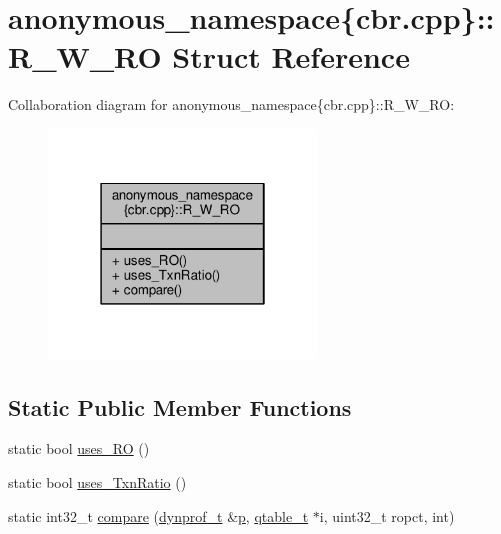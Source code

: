 \hypertarget{structanonymous__namespace_02cbr_8cpp_03_1_1R__W__RO}{\section{anonymous\-\_\-namespace\{cbr.\-cpp\}\-:\-:R\-\_\-\-W\-\_\-\-R\-O Struct Reference}
\label{structanonymous__namespace_02cbr_8cpp_03_1_1R__W__RO}
}


Collaboration diagram for anonymous\-\_\-namespace\{cbr.\-cpp\}\-:\-:R\-\_\-\-W\-\_\-\-R\-O\-:
\nopagebreak
\begin{figure}[H]
\begin{center}
\leavevmode
\includegraphics[width=202pt]{structanonymous__namespace_02cbr_8cpp_03_1_1R__W__RO__coll__graph}
\end{center}
\end{figure}
\subsection*{Static Public Member Functions}
\begin{DoxyCompactItemize}
\item 
static bool \hyperlink{structanonymous__namespace_02cbr_8cpp_03_1_1R__W__RO_ac90abb9e25c3ee2e4f413c8b3810e1a7}{uses\-\_\-\-R\-O} ()
\item 
static bool \hyperlink{structanonymous__namespace_02cbr_8cpp_03_1_1R__W__RO_a45419018095d1c2c12ff8171b19c3051}{uses\-\_\-\-Txn\-Ratio} ()
\item 
static int32\-\_\-t \hyperlink{structanonymous__namespace_02cbr_8cpp_03_1_1R__W__RO_ad4005f5f72f481abb0158491a67a5fac}{compare} (\hyperlink{structstm_1_1dynprof__t}{dynprof\-\_\-t} \&\hyperlink{counted__ptr_8hpp_a5c9f59d7c24e3fd6ceae319a968fc3e0}{p}, \hyperlink{structstm_1_1qtable__t}{qtable\-\_\-t} $\ast$i, uint32\-\_\-t ropct, int)
\end{DoxyCompactItemize}


